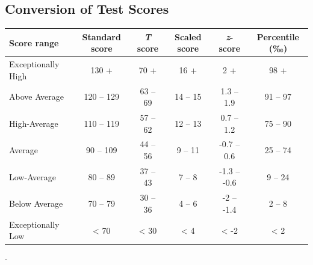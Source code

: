 \documentclass[%
numbers=noendperiod,
parskip=half,
bibliography=totoc,
DIV=calc,headsepline=true,
]{scrartcl}
\newlength{\overhang}
\newenvironment{fullwidth}{%
  \blockmargin
  \begin{addmargin*}[0em]{-\overhang}%
}{%
  \end{addmargin*}%
  \unblockmargin
}
\begin{document}
\hypertarget{conversion-of-test-scores}{%
\subsection{Conversion of Test Scores}\label{conversion-of-test-scores}}



\begin{longtable}[]{@{}lccccc@{}}
\toprule
\textbf{Score range} & \textbf{Standard score} & \textbf{\emph{T}} \textbf{score} & \textbf{Scaled score} & \textbf{\emph{z}-score} & \textbf{Percentile (‰)} \\
\midrule
\endhead
Exceptionally High & 130 + & 70 + & 16 + & 2 + & 98 + \\
Above Average & 120 -- 129 & 63 -- 69 & 14 -- 15 & 1.3 -- 1.9 & 91 -- 97 \\
High-Average & 110 -- 119 & 57 -- 62 & 12 -- 13 & 0.7 -- 1.2 & 75 -- 90 \\
Average & 90 -- 109 & 44 -- 56 & 9 -- 11 & -0.7 -- 0.6 & 25 -- 74 \\
Low-Average & 80 -- 89 & 37 -- 43 & 7 -- 8 & -1.3 -- -0.6 & 9 -- 24 \\
Below Average & 70 -- 79 & 30 -- 36 & 4 -- 6 & -2 -- -1.4 & 2 -- 8 \\
Exceptionally Low & \textless{} 70 & \textless{} 30 & \textless{} 4 & \textless{} -2 & \textless{} 2 \\
\bottomrule
\end{longtable}

\begin{fullwidth}
  \begin{multicols}{2}[\printbibheading]
    \renewcommand{\bibfont}{\small}
    \printbibliography[heading=none]
  \end{multicols}
\end{fullwidth}
\end{document}
